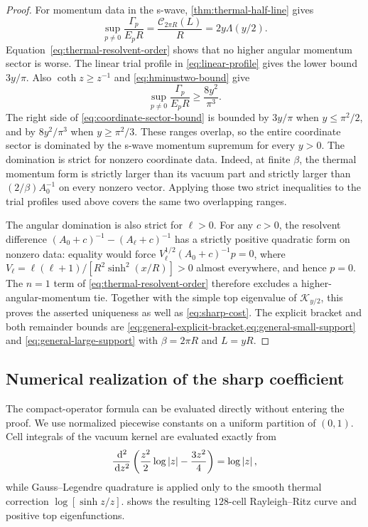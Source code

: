 \begin{proof}
For momentum data in the s-wave, \cref{thm:thermal-half-line} gives
\begin{equation}
 \sup_{p\neq0}\frac{\Gamma_p}{E_pR}
 =\frac{\mathcal C_{2\pi R}(L)}R
 =2y\Lambda(y/2).
 \label{eq:momentum-optimum}
\end{equation}
Equation~\eqref{eq:thermal-resolvent-order} shows that no higher angular
momentum sector is worse.  The linear trial profile in
\cref{eq:linear-profile} gives the lower bound $3y/\pi$.  Also
$\coth z\geq z^{-1}$ and \cref{eq:hminustwo-bound} give
\begin{equation}
 \sup_{p\neq0}\frac{\Gamma_p}{E_pR}\geq\frac{8y^2}{\pi^3}.
 \label{eq:thermal-lower}
\end{equation}
The right side of \cref{eq:coordinate-sector-bound} is bounded by $3y/\pi$
when $y\leq\pi^2/2$, and by $8y^2/\pi^3$ when $y\geq\pi^2/3$.  These ranges
overlap, so the entire coordinate sector is dominated by the s-wave momentum
supremum for every $y>0$.  The domination is strict for nonzero coordinate
data.  Indeed, at finite $\beta$, the thermal momentum form is strictly larger
than its vacuum part and strictly larger than $(2/\beta)A_0^{-1}$ on every
nonzero vector.  Applying those two strict inequalities to the trial profiles
used above covers the same two overlapping ranges.

The angular domination is also strict for $\ell>0$.  For any $c>0$, the
resolvent difference
$(A_0+c)^{-1}-(A_\ell+c)^{-1}$ has a strictly positive quadratic form on
nonzero data: equality would force
$V_\ell^{1/2}(A_0+c)^{-1}p=0$, where
$V_\ell=\ell(\ell+1)/[R^2\sinh^2(x/R)]>0$ almost everywhere, and hence
$p=0$.  The $n=1$ term of \cref{eq:thermal-resolvent-order} therefore excludes
a higher-angular-momentum tie.  Together with the simple top eigenvalue of
$\mathcal K_{y/2}$, this proves the asserted uniqueness as well as
\cref{eq:sharp-cost}.  The explicit bracket and both remainder bounds are
\cref{eq:general-explicit-bracket,eq:general-small-support} and
\cref{eq:general-large-support} with $\beta=2\pi R$ and $L=yR$.
\end{proof}

\subsection{Numerical realization of the sharp coefficient}

The compact-operator formula can be evaluated directly without entering the
proof.  We use normalized piecewise constants on a uniform partition of
$(0,1)$.  Cell integrals of the vacuum kernel are evaluated exactly from
\begin{equation}
 \frac{\,\mathrm d^2}{\,\mathrm d z^2}
 \left(\frac{z^2}{2}\log\left\lvert z\right\rvert-\frac{3z^2}{4}\right)=\log\left\lvert z\right\rvert,
 \label{eq:log-kernel-primitive}
\end{equation}
while Gauss--Legendre quadrature is applied only to the smooth thermal
correction
$\log[\sinh z/z]$.   shows the resulting
$128$-cell Rayleigh--Ritz curve and positive top eigenfunctions.

